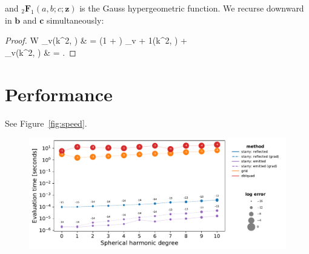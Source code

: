\documentclass[modern]{aastex62}
\begin{document}
%
and ${_2\mathbf{F}_1}(a, b; c; \mathbf{z})$ is the Gauss
hypergeometric function.
%
We recurse downward in $\mathbf{b}$ and $\mathbf{c}$ simultaneously:
%
\begin{proof}{W}
    _v(k^2, \vkappa) & =
    \left(1 + \right)
    _{v + 1}(k^2, \vkappa) +
    \nonumber
    \\
    _v(k^2, \vkappa) & =
    \quad.
\end{proof}


%
\vfill
\pagebreak
%

\section{Performance}
\label{sec:performance}
%
 See Figure~\ref{fig:speed}.
%
\begin{figure}[h!]
    \begin{centering}
        \includegraphics[width=\linewidth]{figures/speed.pdf}
    \end{centering}
\end{figure}

\appendix

\end{document}
